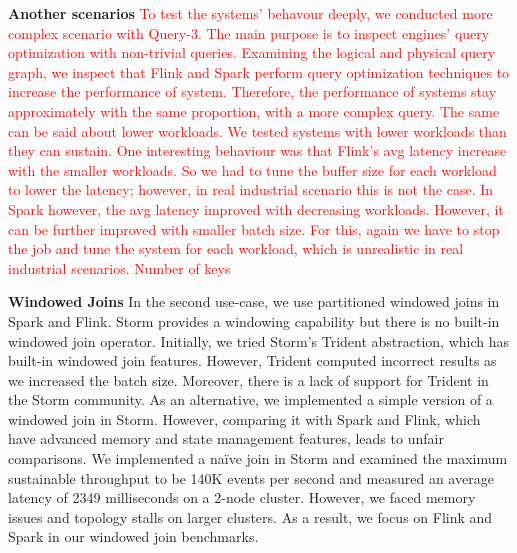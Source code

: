 {\textbf{Another scenarios}
\textcolor{red}{To test the systems' behavour deeply, we conducted more complex scenario with Query-3. The main purpose is to inspect engines' query optimization with non-trivial queries. Examining the logical and physical query graph, we inspect that Flink and Spark perform query optimization techniques to increase the performance of system. Therefore, the performance of systems stay approximately with the same proportion, with a more complex query. The same can be said about lower workloads. We tested systems with lower workloads than they can sustain. One interesting behaviour was that  Flink's avg latency increase with the smaller workloads. So we had to tune the buffer size for each workload to lower the latency; however, in real industrial scenario this is not the case. In Spark however, the avg latency improved with decreasing workloads. However, it can be further improved with smaller batch size. For this, again we have to stop the job and tune the system for each workload, which is unrealistic in real industrial scenarios. 
Number of keys}























\textbf{Windowed Joins}
In the second use-case, we use partitioned windowed joins in Spark and Flink.
  Storm provides a windowing capability but there is no built-in windowed join operator. Initially, we tried Storm's Trident abstrac\-tion, which has built-in windowed join features. However, Trident computed incorrect results as we increased the batch size. Moreover, there is a lack of support for Trident in the Storm community. As an alternative, we implemented a simple version of a windowed join in Storm. However, comparing it with Spark and Flink, which have advanced memory and state management features, leads to unfair comparisons. We implemented a na\"ive join in Storm and examined the maximum sustainable throughput to be 140K events per second and measured an average latency of 2349 milliseconds  on a 2-node cluster. However, we faced memory issues and topology stalls on larger clusters. 
As a result, we focus on Flink and Spark in our windowed join benchmarks.

}
